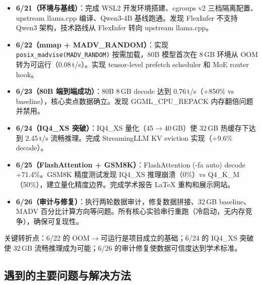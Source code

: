 \begin{itemize}
    \item \textbf{6/21（环境与基线）}：完成 WSL2 开发环境搭建、cgroups v2 三档隔离配置、upstream llama.cpp 编译、Qwen3-4B 基线跑通。发现 FlexInfer 不支持 Qwen3 架构，技术路线从 FlexInfer 转向 upstream llama.cpp。
    \item \textbf{6/22（mmap + MADV\_RANDOM）}：实现 \texttt{posix\_madvise(MADV\_RANDOM)} 按需加载，80B 模型首次在 8\,GB 环境从 OOM 转为可运行（0.08\,t/s）。实现 tensor-level prefetch scheduler 和 MoE router hook。
    \item \textbf{6/23（80B 端到端成功）}：80B 8\,GB decode 达到 0.76\,t/s（+850\% vs baseline），核心卖点数据确立。发现 GGML\_CPU\_REPACK 内存翻倍问题并禁用。
    \item \textbf{6/24（IQ4\_XS 突破）}：IQ4\_XS 量化（45$\to$40\,GB）使 32\,GB 热缓存下达到 2.45\,t/s 流畅推理。完成 StreamingLLM KV eviction 实现（+9.6\% decode）。
    \item \textbf{6/25（FlashAttention + GSM8K）}：FlashAttention (-fa auto) decode +71.4\%。GSM8K 精度测试发现 IQ4\_XS 推理崩溃（0\%）vs Q4\_K\_M（50\%），建立量化精度边界。完成学术报告 LaTeX 重构和展示网站。
    \item \textbf{6/26（审计与修复）}：执行两轮数据审计，修复数据拼接、32\,GB baseline、MADV 百分比计算方向等问题。所有核心实验串行重跑（冷启动，无内存竞争），确保可复现性。
\end{itemize}

关键转折点：6/22 的 OOM$\to$可运行是项目成立的基础；6/24 的 IQ4\_XS 突破使 32\,GB 流畅推理成为可能；6/26 的审计修复使数据可信度达到学术标准。

\subsection{遇到的主要问题与解决方法}

